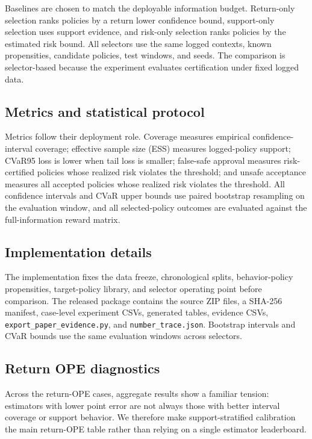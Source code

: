 \documentclass[conference]{IEEEtran}
\begin{document}
Baselines are chosen to match the deployable information budget. Return-only selection ranks policies by a return lower confidence bound, support-only selection uses support evidence, and risk-only selection ranks policies by the estimated risk bound. All selectors use the same logged contexts, known propensities, candidate policies, test windows, and seeds. The comparison is selector-based because the experiment evaluates certification under fixed logged data.

\subsection{Metrics and statistical protocol}

Metrics follow their deployment role. Coverage measures empirical confidence-interval coverage; effective sample size (ESS) measures logged-policy support; CVaR95 loss is lower when tail loss is smaller; false-safe approval measures risk-certified policies whose realized risk violates the threshold; and unsafe acceptance measures all accepted policies whose realized risk violates the threshold. All confidence intervals and CVaR upper bounds use paired bootstrap resampling on the evaluation window, and all selected-policy outcomes are evaluated against the full-information reward matrix.

\subsection{Implementation details}

The implementation fixes the data freeze, chronological splits, behavior-policy propensities, target-policy library, and selector operating point before comparison. The released package contains the source ZIP files, a SHA-256 manifest, case-level experiment CSVs, generated tables, evidence CSVs, \texttt{export\_paper\_evidence.py}, and \texttt{number\_trace.json}. Bootstrap intervals and CVaR bounds use the same evaluation windows across selectors.

\subsection{Return OPE diagnostics}

Across the return-OPE cases, aggregate results show a familiar tension: estimators with lower point error are not always those with better interval coverage or support behavior. We therefore make support-stratified calibration the main return-OPE table rather than relying on a single estimator leaderboard.
\end{document}
